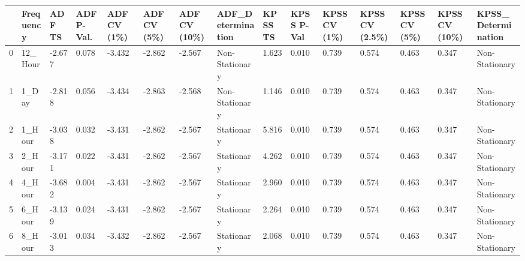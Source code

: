 \begin{tabular}{lllllllllllllll}
\toprule
 & Frequency & ADF TS & ADF P-Val. & ADF CV (1\%) & ADF CV (5\%) & ADF CV (10\%) & ADF_Determination & KPSS TS & KPSS P-Val & KPSS CV (1\%) & KPSS CV (2.5\%) & KPSS CV (5\%) & KPSS CV (10\%) & KPSS_Determination \\
\midrule
0 & 12_Hour & -2.677 & 0.078 & -3.432 & -2.862 & -2.567 & Non-Stationary & 1.623 & 0.010 & 0.739 & 0.574 & 0.463 & 0.347 & Non-Stationary \\
1 & 1_Day & -2.818 & 0.056 & -3.434 & -2.863 & -2.568 & Non-Stationary & 1.146 & 0.010 & 0.739 & 0.574 & 0.463 & 0.347 & Non-Stationary \\
2 & 1_Hour & -3.038 & 0.032 & -3.431 & -2.862 & -2.567 & Stationary & 5.816 & 0.010 & 0.739 & 0.574 & 0.463 & 0.347 & Non-Stationary \\
3 & 2_Hour & -3.171 & 0.022 & -3.431 & -2.862 & -2.567 & Stationary & 4.262 & 0.010 & 0.739 & 0.574 & 0.463 & 0.347 & Non-Stationary \\
4 & 4_Hour & -3.682 & 0.004 & -3.431 & -2.862 & -2.567 & Stationary & 2.960 & 0.010 & 0.739 & 0.574 & 0.463 & 0.347 & Non-Stationary \\
5 & 6_Hour & -3.139 & 0.024 & -3.431 & -2.862 & -2.567 & Stationary & 2.264 & 0.010 & 0.739 & 0.574 & 0.463 & 0.347 & Non-Stationary \\
6 & 8_Hour & -3.013 & 0.034 & -3.432 & -2.862 & -2.567 & Stationary & 2.068 & 0.010 & 0.739 & 0.574 & 0.463 & 0.347 & Non-Stationary \\
\bottomrule
\end{tabular}
